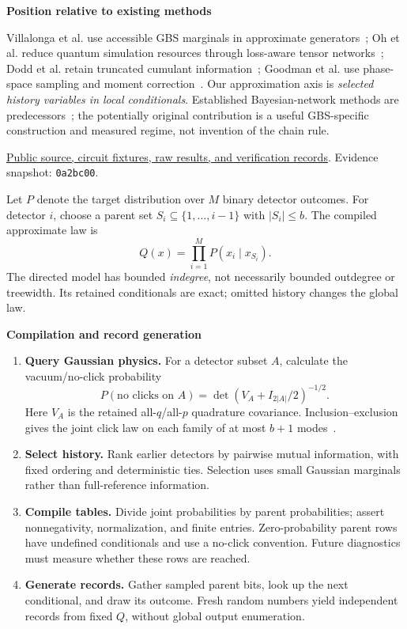 \documentclass[11pt,letterpaper]{article}
\newcommand{\heading}[1]{\vspace{5pt}{\large\bfseries\color{ink}#1}\par\vspace{2pt}}
\newcommand{\subheading}[1]{{\bfseries\color{ink}#1}\par}
\newcommand{\repo}{https://github.com/AnishKumar-gesgts2/GBS-Detector-Context}
\begin{document}
\subheading{Position relative to existing methods}
Villalonga et al. use accessible GBS marginals in approximate generators~\cite{villalonga}; Oh et al. reduce quantum simulation resources through loss-aware tensor networks~\cite{oh}; Dodd et al. retain truncated cumulant information~\cite{dodd}; Goodman et al. use phase-space sampling and moment correction~\cite{goodman}. Our approximation axis is \emph{selected history variables in local conditionals}. Established Bayesian-network methods are predecessors~\cite{k2,friedman}; the potentially original contribution is a useful GBS-specific construction and measured regime, not invention of the chain rule.

{\small\color{muted}\href{\repo/tree/0a2bc0038d4480ee489649a8982698c786a4d58d/GBS\%20Classical\%20Simulation}{Public source, circuit fixtures, raw results, and verification records}. Evidence snapshot: \texttt{0a2bc00}.}

\newpage
\heading{2. Algorithm, error mechanism, and implementation}
Let $P$ denote the target distribution over $M$ binary detector outcomes. For detector $i$, choose a parent set $S_i\subseteq\{1,\ldots,i-1\}$ with $|S_i|\leq b$. The compiled approximate law is
\begin{equation}
 Q(x)=\prod_{i=1}^{M}P(x_i\mid x_{S_i}).
 \label{eq:model}
\end{equation}
The directed model has bounded \emph{indegree}, not necessarily bounded outdegree or treewidth. Its retained conditionals are exact; omitted history changes the global law.

\subheading{Compilation and record generation}
\begin{enumerate}
\item \textbf{Query Gaussian physics.} For a detector subset $A$, calculate the vacuum/no-click probability
\[
 P(\text{no clicks on }A)=\det\!\left(V_A+I_{2|A|}/2\right)^{-1/2}.
\]
Here $V_A$ is the retained all-$q$/all-$p$ quadrature covariance. Inclusion--exclusion gives the joint click law on each family of at most $b+1$ modes~\cite{quesada}.
\item \textbf{Select history.} Rank earlier detectors by pairwise mutual information, with fixed ordering and deterministic ties. Selection uses small Gaussian marginals rather than full-reference information.
\item \textbf{Compile tables.} Divide joint probabilities by parent probabilities; assert nonnegativity, normalization, and finite entries. Zero-probability parent rows have undefined conditionals and use a no-click convention. Future diagnostics must measure whether these rows are reached.
\item \textbf{Generate records.} Gather sampled parent bits, look up the next conditional, and draw its outcome. Fresh random numbers yield independent records from fixed $Q$, without global output enumeration.
\end{enumerate}
\end{document}

